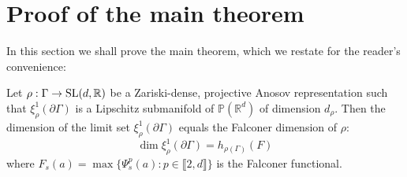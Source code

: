 \documentclass{report}
\begin{document}
\section{Proof of the main theorem}\label{sec:main_thm_proof}
In this section we shall prove the main theorem, which we restate for the reader's convenience:
\begin{theorem}\label{thm:main}
    Let $\rho: \Gamma \to \operatorname{{\mathrm{SL}}}(d, \mathbb R)$ be a Zariski-dense, projective Anosov representation such that $\xi^1_\rho(\partial \Gamma)$ is a Lipschitz submanifold of $\mathbb P(\mathbb R^d)$ of dimension $d_\rho$.
    Then the dimension of the limit set $\xi_\rho^1(\partial \Gamma)$ equals the Falconer dimension of $\rho$:
    \[
        \dim \xi_\rho^1(\partial \Gamma) = h_{\rho(\Gamma)}(F)
    \]
    where $F_s(a) = \max \{ \Psi_s^p(a) : p \in \llbracket 2, d \rrbracket\}$ is the Falconer functional.
\end{theorem}
\end{document}
